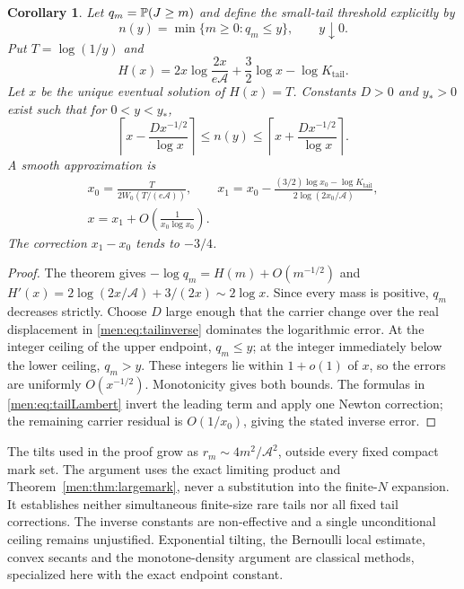 \documentclass[11pt,letterpaper]{article}
\newtheorem{corollary}[theorem]{Corollary}
\theoremstyle{remark}\newtheorem{remark}[theorem]{Remark}
\begin{document}
\begin{corollary}\label{men:cor:tailinverse}
Let $q_m=\mathbb P(J\ge m)$ and define the small-tail threshold explicitly by
\[
 n(y)=\min\{m\ge0:q_m\le y\},\qquad y\downarrow0.
\]
Put $T=\log(1/y)$ and
\[
 H(x)=2x\log\frac{2x}{e\mathcal A}+\frac32\log x-\log K_{\mathrm{tail}}.
\]
Let $x$ be the unique eventual solution of $H(x)=T$. Constants $D>0$ and $y_*>0$ exist such that for $0<y<y_*$,
\begin{equation}\label{men:eq:tailinverse}
 \left\lceil x-\frac{Dx^{-1/2}}{\log x}\right\rceil
 \le n(y)\le
 \left\lceil x+\frac{Dx^{-1/2}}{\log x}\right\rceil.
\end{equation}
A smooth approximation is
\begin{equation}\label{men:eq:tailLambert}
 \begin{gathered}
 x_0=\frac{T}{2W_0(T/(e\mathcal A))},\qquad
 x_1=x_0-\frac{(3/2)\log x_0-\log K_{\mathrm{tail}}}
                   {2\log(2x_0/\mathcal A)},\\
 x=x_1+O\left(\frac1{x_0\log x_0}\right).
 \end{gathered}
\end{equation}
The correction $x_1-x_0$ tends to $-3/4$.
\end{corollary}
\begin{proof}
The theorem gives $-\log q_m=H(m)+O(m^{-1/2})$ and
$H'(x)=2\log(2x/\mathcal A)+3/(2x)\sim2\log x$. Since every mass is positive, $q_m$ decreases strictly. Choose $D$ large enough that the carrier change over the real displacement in \eqref{men:eq:tailinverse} dominates the logarithmic error. At the integer ceiling of the upper endpoint, $q_m\le y$; at the integer immediately below the lower ceiling, $q_m>y$. These integers lie within $1+o(1)$ of $x$, so the errors are uniformly $O(x^{-1/2})$. Monotonicity gives both bounds. The formulas in \eqref{men:eq:tailLambert} invert the leading term and apply one Newton correction; the remaining carrier residual is $O(1/x_0)$, giving the stated inverse error.
\end{proof}

The tilts used in the proof grow as $r_m\sim4m^2/\mathcal A^2$, outside every fixed compact mark set. The argument uses the exact limiting product and Theorem~\ref{men:thm:largemark}, never a substitution into the finite-$N$ expansion. It establishes neither simultaneous finite-size rare tails nor all fixed tail corrections. The inverse constants are non-effective and a single unconditional ceiling remains unjustified. Exponential tilting, the Bernoulli local estimate, convex secants and the monotone-density argument are classical methods, specialized here with the exact endpoint constant.
\end{document}
